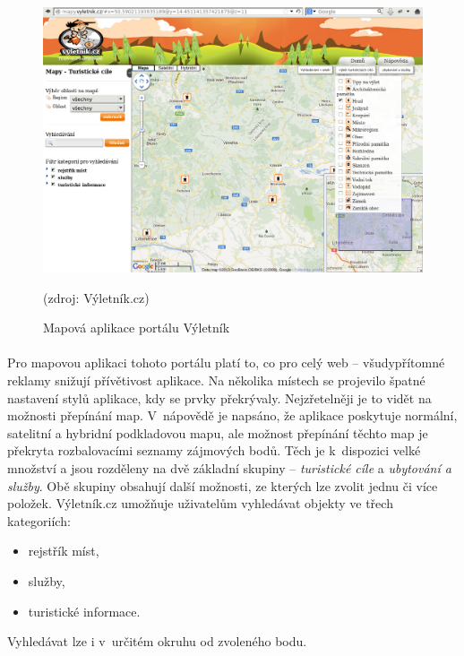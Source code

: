 \documentclass[11pt,a4paper,titlepage,oneside]{book}
\begin{document}

		\begin{figure}[!h]
			\begin{center}
				\includegraphics[width=12cm]{obrazky/vyletnik.png}
				\caption{Mapová aplikace portálu Výletník}
				(zdroj: Výletník.cz\cite{vyletnikMapa})
			\end{center}
		\end{figure}


		\paragraph{} Pro mapovou aplikaci tohoto portálu platí to, co pro celý web -- všudy\-přítomné reklamy snižují přívětivost aplikace. Na několika místech se projevilo špatné nastavení stylů aplikace, kdy se prvky překrývaly. Nejzřetelněji je to vidět na možnosti přepínání map. V~nápovědě\cite{vyletnik} je napsáno, že aplikace poskytuje normální, satelitní a hybridní podkladovou mapu, ale možnost přepínání těchto map je překryta rozbalovacími seznamy zájmových bodů. Těch je k~dispozici velké množství a jsou rozděleny na dvě základní skupiny -- \textit{turistické cíle} a \textit{ubytování a služby}. Obě skupiny obsahují další možnosti, ze kterých lze zvolit jednu či více položek. Výletník.cz umožňuje uživatelům vyhledávat objekty ve třech kategoriích:
			\begin{itemize}
				\item rejstřík míst,
				\item služby,
				\item turistické informace.
			\end{itemize}
Vyhledávat lze i v~určitém okruhu od zvoleného bodu.
\end{document}
